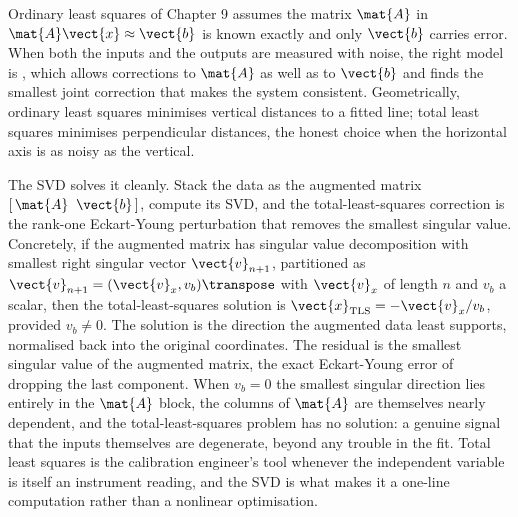 Ordinary least squares of Chapter 9 assumes the matrix $\mat{A}$ in
$\mat{A}\vect{x} \approx \vect{b}$ is known exactly and only $\vect{b}$
carries error. When both the inputs and the outputs are measured with
noise, the right model is , which allows
corrections to $\mat{A}$ as well as to $\vect{b}$ and finds the
smallest joint correction that makes the system consistent.
Geometrically, ordinary least squares minimises vertical distances to a
fitted line; total least squares minimises perpendicular distances, the
honest choice when the horizontal axis is as noisy as the vertical.

The SVD solves it cleanly. Stack the data as the augmented matrix
$[\,\mat{A}\;\;\vect{b}\,]$, compute its SVD, and the total-least-squares
correction is the rank-one Eckart-Young perturbation that removes the
smallest singular value. Concretely, if the augmented matrix has
singular value decomposition with smallest right singular vector
$\vect{v}_{n+1}$, partitioned as $\vect{v}_{n+1} = (\vect{v}_{x},
v_{b})\transpose$ with $\vect{v}_{x}$ of length $n$ and $v_{b}$ a
scalar, then the total-least-squares solution is $\vect{x}_{\text{TLS}}
= -\vect{v}_{x}/v_{b}$, provided $v_{b} \neq 0$. The solution is the
direction the augmented data least supports, normalised back into the
original coordinates. The residual is the smallest singular value of the
augmented matrix, the exact Eckart-Young error of dropping the last
component. When $v_{b} = 0$ the smallest singular direction lies
entirely in the $\mat{A}$ block, the columns of $\mat{A}$ are themselves
nearly dependent, and the total-least-squares problem has no solution: a
genuine signal that the inputs themselves are degenerate, beyond any
trouble in the fit. Total
least squares is the calibration engineer's tool whenever the
independent variable is itself an instrument reading, and the SVD is
what makes it a one-line computation rather than a nonlinear
optimisation.

